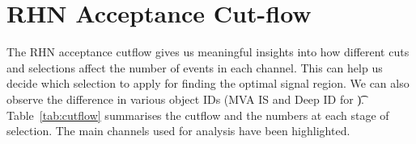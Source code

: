 \documentclass[letterpaper,12pt]{article}
\begin{document}
\begin{table}[h]
  \centering
  \Large
  \setlength{\tabcolsep}{20pt}
  \renewcommand{\arraystretch}{2.5}
  \caption{Summary table for the \3l{} channel.}
  \label{tab:3l}
  \vspace{1cm}
\end{table}

\section{RHN Acceptance Cut-flow}
\label{sec:cutflow}

The RHN acceptance cutflow gives us meaningful insights into how different cuts and selections affect the number of events in each channel. This can help us decide which selection to apply for finding the optimal signal region. We can also observe the difference in various object IDs (MVA IS and Deep ID for \t). Table~\ref{tab:cutflow} summarises the cutflow and the numbers at each stage of selection. The main channels used for analysis have been highlighted.\\
\rule{0pt}{1cm}
\end{document}
